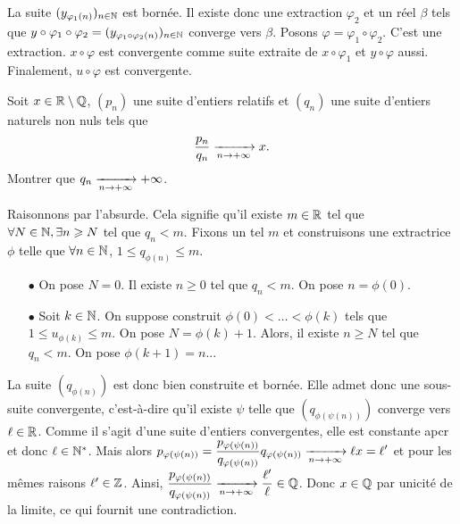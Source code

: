 \documentclass{magnoliaold}
\begin{document}
\begin{preuve}
\begin{itemize}
La suite $(y_{\varphi_1(n)})_{n\in\mathbb{N}}$ est bornée. Il existe donc une extraction $\varphi_2$ et un réel $\beta$ tels que $y\circ \varphi_1 \circ \varphi_2=(y_{\varphi_1\circ\varphi_2(n)})_{n\in\mathbb{N}}$ converge vers $\beta$.
Posons $\varphi=\varphi_1\circ\varphi_2$. C'est une extraction. $x\circ\varphi$ est convergente comme suite extraite de $x\circ\varphi_1$ et $y\circ\varphi$ aussi.\\

Finalement, $u\circ \varphi$ est convergente.
\end{itemize}
\end{preuve}

\begin{exoUnique}
\exo Soit $x\in\mathbb{R}\setminus\mathbb{Q}$, $(p_n)$ une suite d'entiers relatifs et
  $(q_n)$ une suite d'entiers naturels non nuls tels que
  \[\frac{p_n}{q_n}\xrightarrow[n\rightarrow +\infty]{} x.\]
  Montrer que $q_n\xrightarrow[n\rightarrow +\infty]{}+\infty$.
\end{exoUnique}
\begin{sol}
Raisonnons par l'absurde. Cela signifie qu'il existe $m\in \mathbb{R}$ tel que $\forall N \in \mathbb{N}, \exists n\geqslant N$ tel que $q_n < m$.
Fixons un tel $m$ et construisons une extractrice $\phi$ telle que $\forall n \in \mathbb{N}$, $1\leq q_{\phi(n)}\leq m$.
\begin{itemize}
\item[$\bullet$] On pose $N=0$. Il existe $n\geq 0$ tel que $q_n<m$. On pose $n=\phi(0)$.
\item[$\bullet$] Soit $k\in \mathbb{N}$. On suppose construit $\phi(0)< \ldots< \phi(k)$ tels que $1\leq u_{\phi(k)}\leq m$.
On pose $N=\phi(k)+1$. Alors, il existe $n\geq N$ tel que $q_n<m$. On pose $\phi(k+1)=n$...
\end{itemize}
La suite $(q_{\phi(n)})$ est donc bien construite et bornée. Elle admet donc une sous-suite convergente, c'est-à-dire qu'il existe $\psi$ telle que $(q_{\phi(\psi(n))})$ converge vers $\ell \in \mathbb{R}$. Comme il s'agit d'une suite d'entiers convergentes, elle est constante apcr et donc $\ell \in {\mathbb{N}^*}$. Mais alors $\displaystyle p_{\varphi(\psi(n))}=\frac{p_{\varphi(\psi(n))}}{q_{\varphi(\psi(n))}}q_{\varphi(\psi(n))} \xrightarrow[n\rightarrow +\infty]{}{\ell x}=\ell'$ et pour les mêmes raisons $\ell' \in \mathbb{Z}$.
Ainsi, $\displaystyle \frac{p_{\varphi(\psi(n))}}{q_{\varphi(\psi(n))}} \xrightarrow[n\rightarrow +\infty]{} \frac{\ell'}{\ell} \in \mathbb{Q}$. Donc $x\in \mathbb{Q}$ par unicité de la limite, ce qui fournit une contradiction.
\end{sol}
\end{document}
